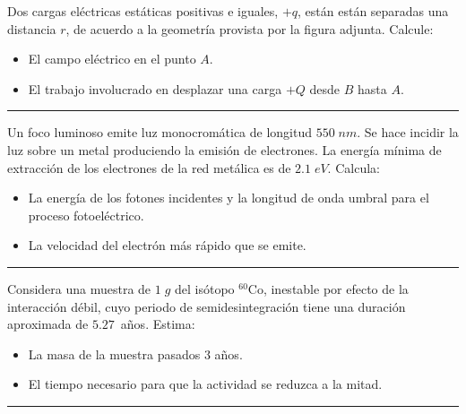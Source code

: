 \documentclass[a4paper,12pt]{exam}
\newcommand*\chem[1]{\ensuremath{\mathrm{#1}}}
\newcommand{\halmos}{\vspace*{-7mm}
	
					\begin{flushright}
						\rule{1mm}{2.5mm} 
					\end{flushright}\vspace*{-6mm}
						
					  }
\renewcommand{\qed}{\halmos}
\begin{document}
\begin{enumerate}
 			
	

	
	
	\begin{minipage}{.55\textwidth}
		\item  Dos cargas eléctricas estáticas positivas e iguales, $+q$, están están separadas una distancia $r$, de acuerdo a la geometría provista por la figura adjunta. Calcule:
	
			\begin{itemize}			 
			 	\item[a)] El campo eléctrico en el punto $A$.
			 	\item[b)] El trabajo involucrado en desplazar una carga $+Q$ desde $B$ hasta $A$.
			 \end{itemize}
		\end{minipage}\hfill
		\begin{minipage}{.45\textwidth}
		\vspace*{2ex}
		
		\hspace*{.7cm}\def\svgwidth{.75\linewidth}
			
		\end{minipage}
		\qed
	
	
	\item Un foco luminoso emite luz monocromática de longitud $550\;nm$. Se hace incidir 				la luz sobre un metal produciendo la emisión de electrones. La energía mínima de extracción de los 						electrones de la red metálica es de $2.1\;eV$. Calcula:
			\begin{itemize}
				\item[a)] La energía de los fotones incidentes y la longitud de onda umbral para el proceso fotoeléctrico.
				\item[b)] La velocidad del electrón más rápido que se emite.
			\end{itemize}		 
		\qed			
		
	\item Considera una muestra de $1\;g$ del isótopo $^{60}\chem{Co}$, inestable por efecto de la interacción débil, cuyo periodo de semidesintegración tiene una duración aproximada de $5.27\,$ años. Estima:
	\begin{itemize}
		\item[a)] La masa de la muestra pasados $3$ años.
		\item[b)] El tiempo necesario para que la actividad se reduzca a la mitad.
	\end{itemize}
	\qed
		
\end{enumerate}		
 
\end{document}
